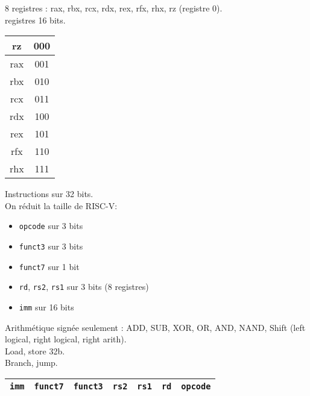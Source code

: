 \documentclass[a4paper]{article}
\begin{document}
    8 registres : rax, rbx, rcx, rdx, rex, rfx, rhx, rz (registre 0).\\
    registres 16 bits.\\
    \begin{tabular}{|c|c|}
        \hline
        rz  & 000\\
        \hline
        rax & 001\\
        \hline
        rbx & 010\\
        \hline
        rcx & 011\\
        \hline
        rdx & 100\\
        \hline 
        rex & 101\\
        \hline 
        rfx & 110\\
        \hline
        rhx & 111\\
        \hline  
    \end{tabular}

    Instructions sur 32 bits.\\
    On réduit la taille de RISC-V:\begin{itemize}
        \item \texttt{opcode} sur 3 bits
        \item \texttt{funct3} sur 3 bits
        \item \texttt{funct7} sur 1 bit 
        \item \texttt{rd}, \texttt{rs2}, \texttt{rs1} sur 3 bits (8 registres)
        \item \texttt{imm} sur 16 bits
    \end{itemize}
    Arithmétique signée seulement : ADD, SUB, XOR, OR, AND, NAND, Shift (left logical, right logical, right arith).\\
    Load, store 32b.\\
    Branch, jump.

    \begin{tabular}{|c|c|c|c|c|c|c|}
        \hline
        \texttt{imm} & \texttt{funct7} & \texttt{funct3} & \texttt{rs2} & \texttt{rs1} & \texttt{rd} & \texttt{opcode} \\
        \hline
    \end{tabular}
\end{document}
